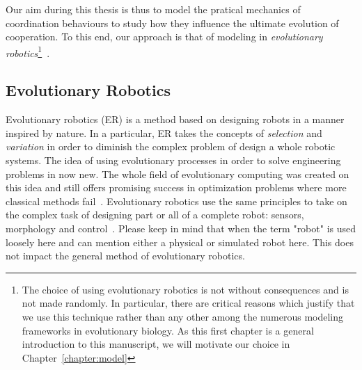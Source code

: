     Our aim during this thesis is thus to model the pratical mechanics of coordination behaviours to study how they influence the ultimate evolution of cooperation. To this end, our approach is that of modeling in \emph{evolutionary robotics}\footnote{The choice of using evolutionary robotics is not without consequences and is not made randomly. In particular, there are critical reasons which justify that we use this technique rather than any other among the numerous modeling frameworks in evolutionary biology. As this first chapter is a general introduction to this manuscript, we will motivate our choice in Chapter~\ref{chapter:model}}~\parencite{Nolfi2000}.


  \subsection{Evolutionary Robotics}

    Evolutionary robotics (ER) is a method based on designing robots in a manner inspired by nature. In a particular, ER takes the concepts of \emph{selection} and \emph{variation} in order to diminish the complex problem of design a whole robotic systems. The idea of using evolutionary processes in order to solve engineering problems in now new. The whole field of evolutionary computing was created on this idea and still offers promising success in optimization problems where more classical methods fail~\parencite{Holland1975, Goldberg1989, Eiben2003}. Evolutionary robotics use the same principles to take on the complex task of designing part or all of a complete robot: sensors, morphology and control~\parencite{Nolfi2000, Nolfi2008, Doncieux2015a}. Please keep in mind that when the term "robot" is used loosely here and can mention either a physical or simulated robot here. This does not impact the general method of evolutionary robotics.


